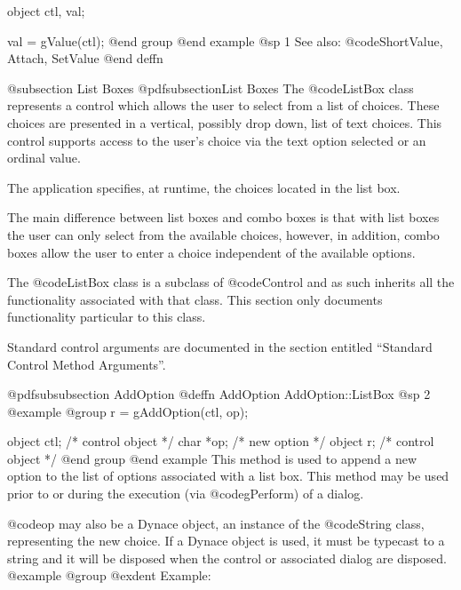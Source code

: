 object  ctl, val;

val = gValue(ctl);
@end group
@end example
@sp 1
See also:  @code{ShortValue, Attach, SetValue}
@end deffn











@subsection List Boxes
@pdfsubsection{List Boxes}
The @code{ListBox} class represents a control which allows the user
to select from a list of choices.  These choices are presented in
a vertical, possibly drop down, list of text choices.  This control
supports access to the user's choice via the text option selected or
an ordinal value.

The application specifies, at runtime, the choices located in the list box.

The main difference between list boxes and combo boxes is that with list
boxes the user can only select from the available choices, however, in
addition, combo boxes allow the user to enter a choice independent of
the available options.

The @code{ListBox} class is a subclass of @code{Control} and as such
inherits all the functionality associated with that class.  This section
only documents functionality particular to this class.

Standard control arguments are documented in the section entitled
``Standard Control Method Arguments''.













@pdfsubsubsection {AddOption}
@deffn {AddOption} AddOption::ListBox
@sp 2
@example
@group
r = gAddOption(ctl, op);

object  ctl;    /*  control object  */
char    *op;    /*  new option      */
object  r;      /*  control object  */
@end group
@end example
This method is used to append a new option to the list of options associated
with a list box.  This method may be used prior to or during the execution
(via @code{gPerform}) of a dialog.

@code{op} may also be a Dynace object, an instance of the @code{String}
class, representing the new choice.  If a Dynace object is used, it must
be typecast to a string and it will be disposed when the control or
associated dialog are disposed.
@example
@group
@exdent Example:

